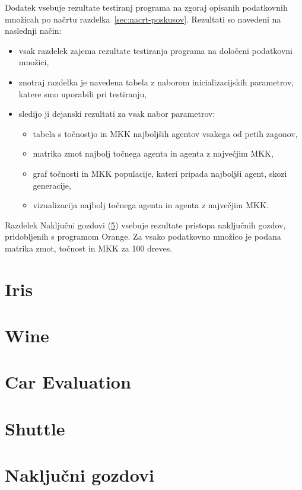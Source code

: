 Dodatek vsebuje rezultate testiranj programa na zgoraj opisanih podatkovnih množicah po načrtu razdelka~\ref{sec:nacrt-poskusov}.
Rezultati so navedeni na naslednji način:
\begin{itemize}
    \item vsak razdelek zajema rezultate testiranja programa na določeni podatkovni množici,
    \item znotraj razdelka je navedena tabela z naborom inicializacijskih parametrov, katere smo uporabili pri testiranju,
    \item sledijo ji dejanski rezultati za vsak nabor parametrov:
    \begin{itemize}
        \item tabela s točnostjo in MKK najboljših agentov vsakega od petih zagonov,
        \item matrika zmot najbolj točnega agenta in agenta z največjim MKK,
        \item graf točnosti in MKK populacije, kateri pripada najboljši agent, skozi generacije,
        \item vizualizacija najbolj točnega agenta in agenta z največjim MKK.
    \end{itemize}
\end{itemize}

Razdelek Naključni gozdovi (\ref{sec:random-forest-test}) vsebuje rezultate pristopa naključnih gozdov, pridobljenih s programom Orange.
Za vsako podatkovno množico je podana matrika zmot, točnost in MKK za 100 dreves.

\section{Iris}\label{sec:dodatek-iris-test}


\section{Wine}\label{sec:dodatek-wine-test}


\section{Car Evaluation}\label{sec:dodatek-car-test}


\section{Shuttle}\label{sec:dodatek-statlog-test}


\section{Naključni gozdovi}\label{sec:random-forest-test}


